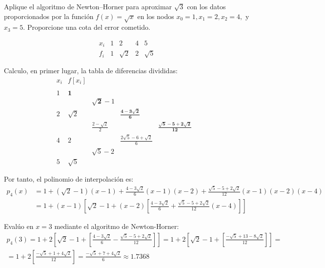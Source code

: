 \begin{ejercicio}
    Aplique el algoritmo de Newton–Horner para aproximar $\sqrt{3}$ con los datos proporcionados por la función $f(x) =\sqrt{x}$ en los nodos $x_0 = 1, x_1 = 2, x_2 = 4, $ y $ x_3 = 5$. Proporcione una cota del error cometido.

    \begin{equation*}
        \begin{array}{c|cccc}
            x_i & 1 & 2 & 4 & 5 \\ \hline
            f_i & 1 & \sqrt{2} & 2 & \sqrt{5}
        \end{array}
    \end{equation*}

    Calculo, en primer lugar, la tabla de diferencias divididas:
    \begin{equation*}
        \begin{array}{c|cccccc}
            x_i & f[x_i] \\
            \\
            1 & \textbf{1} \\
            && \mathbf{\sqrt{2}}-1\\
            2 & \sqrt{2} && \mathbf{\frac{4-3\sqrt{2}}{6}}\\
            && \frac{2-\sqrt{2}}{2}&&\mathbf{\frac{\sqrt{5}-5+2\sqrt{2}}{12}}\\
            4 & 2 && \frac{2\sqrt{5}-6+\sqrt{2}}{6} &&\\
            && \sqrt{5}-2\\
            5 & \sqrt{5}
        \end{array}
    \end{equation*}

    Por tanto, el polinomio de interpolación es:
    \begin{equation*}
        \begin{split}
            p_4(x) &= 1+(\sqrt{2}-1)(x-1) +\frac{4-3\sqrt{2}}{6}(x-1)(x-2) + \frac{\sqrt{5}-5+2\sqrt{2}}{12}(x-1)(x-2)(x-4) \\
            &= 1+(x-1)\left[\sqrt{2}-1 +(x-2)\left[\frac{4-3\sqrt{2}}{6} +\frac{\sqrt{5}-5+2\sqrt{2}}{12}(x-4)\right]\right]
        \end{split}
    \end{equation*}

    Evalúo en $x=3$ mediante el algoritmo de Newton-Horner:
    \begin{multline*}
            p_4(3) = 1+2\left[\sqrt{2}-1 +\left[\frac{4-3\sqrt{2}}{6} -\frac{\sqrt{5}-5+2\sqrt{2}}{12}\right]\right]
            = 1+2\left[\sqrt{2}-1 +\left[\frac{-\sqrt{5}+13-8\sqrt{2}}{12}\right]\right] =\\
            = 1+2\left[\frac{-\sqrt{5}+1+4\sqrt{2}}{12}\right]
            = \frac{-\sqrt{5}+7+4\sqrt{2}}{6} \approx 1.7368
    \end{multline*}


\end{ejercicio}
